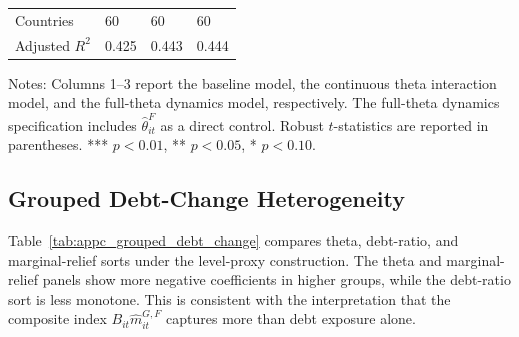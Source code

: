 \begin{table}[H]
\begin{threeparttable}
\begin{tabularx}{\textwidth}{lYYY}
Countries & 60 & 60 & 60 \\
Adjusted $R^2$ & 0.425 & 0.443 & 0.444 \\
\bottomrule
\end{tabularx}
\begin{tablenotes}[flushleft]\footnotesize
\item Notes: Columns 1--3 report the baseline model, the continuous theta interaction model, and the full-theta dynamics model, respectively. The full-theta dynamics specification includes $\widehat\theta^F_{it}$ as a direct control. Robust $t$-statistics are reported in parentheses. *** $p<0.01$, ** $p<0.05$, * $p<0.10$.
\end{tablenotes}
\end{threeparttable}
\end{table}

\subsection{Grouped Debt-Change Heterogeneity}

Table~\ref{tab:appc_grouped_debt_change} compares theta, debt-ratio, and marginal-relief sorts under the level-proxy construction. The theta and marginal-relief panels show more negative coefficients in higher groups, while the debt-ratio sort is less monotone. This is consistent with the interpretation that the composite index $B_{it}\widehat m^{G,F}_{it}$ captures more than debt exposure alone.

